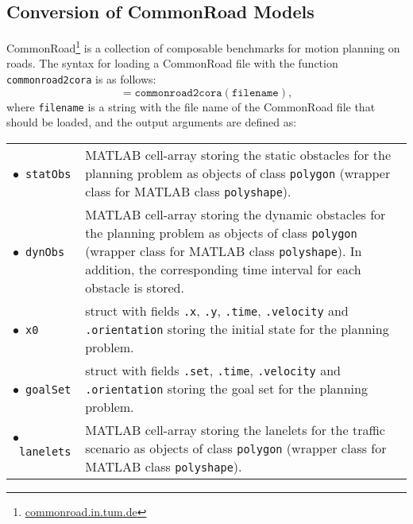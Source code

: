 \subsection{Conversion of CommonRoad Models}
\label{sec:commonroad2cora}

CommonRoad\footnote{\url{commonroad.in.tum.de}} is a collection of composable benchmarks for motion planning on roads.
The syntax for loading a CommonRoad file with the function \texttt{commonroad2cora} is as follows:
\begin{equation*}
	[\texttt{statObs},\texttt{dynObs},\texttt{x0},\texttt{goalSet},\texttt{lanelets}] = \texttt{commonroad2cora}(\texttt{filename}),
\end{equation*}
where \texttt{filename} is a string with the file name of the CommonRoad file that should be loaded, and the output arguments are defined as:
\begin{center}
\renewcommand{\arraystretch}{1.3}
\begin{tabular}[t]{l p{13cm} }
	$\bullet$~\texttt{statObs} & MATLAB cell-array storing the static obstacles for the planning problem as objects of class \texttt{polygon} (wrapper class for MATLAB class \texttt{polyshape}). \\
	$\bullet$~\texttt{dynObs} & MATLAB cell-array storing the dynamic obstacles for the planning problem as objects of class \texttt{polygon} (wrapper class for MATLAB class \texttt{polyshape}). In addition, the corresponding time interval for each obstacle is stored. \\
	$\bullet$~\texttt{x0} & struct with fields \texttt{.x}, \texttt{.y}, \texttt{.time}, \texttt{.velocity} and \texttt{.orientation} storing the initial state for the planning problem. \\
	$\bullet$~\texttt{goalSet} & struct with fields \texttt{.set}, \texttt{.time}, \texttt{.velocity} and \texttt{.orientation} storing the goal set for the planning problem. \\
	$\bullet$~\texttt{lanelets} & MATLAB cell-array storing the lanelets for the traffic scenario as objects of class \texttt{polygon} (wrapper class for MATLAB class \texttt{polyshape}).
\end{tabular}
\end{center}